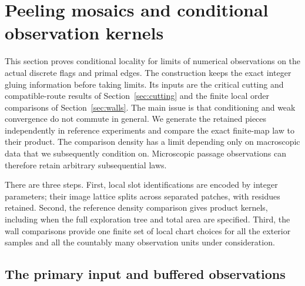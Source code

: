 \section{Peeling mosaics and conditional observation kernels}\label{sec:kernels}

This section proves conditional locality for limits of numerical observations on the actual discrete
flags and primal edges. The construction keeps the exact integer gluing information before taking
limits. Its inputs are the critical cutting and compatible-route results of
Section~\ref{sec:cutting} and the finite local order comparisons of Section~\ref{sec:walls}.
The main issue is that conditioning and weak convergence do not commute in general.
We generate the retained pieces independently in reference experiments and compare the
exact finite-map law to their product. The comparison density has a limit depending
only on macroscopic data that we subsequently condition on. Microscopic passage
observations can therefore retain arbitrary subsequential laws.

There are three steps. First, local slot identifications are encoded by integer
parameters; their image lattice splits across separated patches, with residues
retained. Second, the reference density comparison gives product kernels, including
when the full exploration tree and total area are specified. Third, the wall
comparisons provide one finite set of local chart choices for all the exterior
samples and all the countably many observation units under consideration.

\subsection{The primary input and buffered observations}

